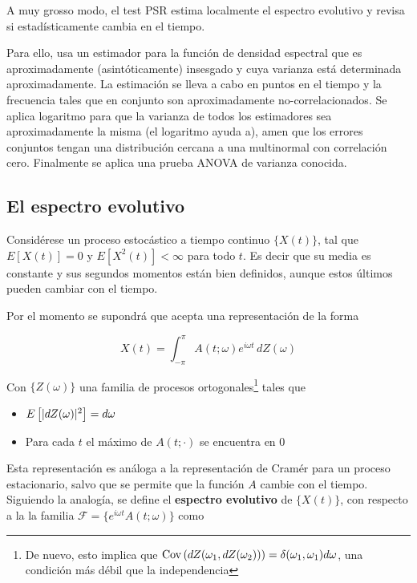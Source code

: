
A muy grosso modo, el test PSR estima localmente  el espectro evolutivo
 y revisa si estad\'isticamente
cambia en el tiempo.

Para ello, usa un estimador para la funci\'on de densidad espectral
que es aproximadamente (asint\'oticamente) insesgado y cuya varianza est\'a
determinada aproximadamente. La estimaci\'on se lleva a cabo en puntos en el tiempo y
la frecuencia tales que en conjunto son aproximadamente no-correlacionados.
Se aplica logaritmo para que la varianza de todos los estimadores sea aproximadamente
la misma (el logaritmo ayuda a), amen que los errores conjuntos tengan una
distribuci\'on cercana a una multinormal con correlaci\'on cero.
Finalmente se aplica una prueba ANOVA de varianza conocida.


\subsection{El espectro evolutivo}

Consid\'erese un proceso estoc\'astico a tiempo continuo $\{X(t)\}$, tal que
$E[X(t)]=0$ y $E\left[ X^{2}(t)\right] < \infty$ para todo $t$. Es decir que su media es constante
y sus segundos momentos est\'an bien definidos, aunque 
estos \'ultimos pueden cambiar con el tiempo.

Por el momento se supondr\'a que acepta una representaci\'on de la forma

\begin{equation*}
X(t) = \int_{-\pi}^{\pi} A(t ; \omega) e^{i\omega t} \, d Z(\omega)
\end{equation*}

Con $\{ Z(\omega) \}$ una familia de procesos ortogonales\footnote{De nuevo, esto implica que
$\mathrm{Cov}\left( dZ(\omega_1,dZ(\omega_2)) \right) = \delta(\omega_1,\omega_1) d\omega$, una condici\'on m\'as
d\'ebil que la independencia} tales que

\begin{itemize}
\item $E \left[\lvert  dZ(\omega) \rvert^{2} \right] = d\omega$
\item Para cada $t$ el m\'aximo de $A(t;\cdot)$ se encuentra en 0
\end{itemize}

Esta representaci\'on es an\'aloga a la representaci\'on de Cram\'er para un proceso
estacionario, salvo que se permite que la funci\'on $A$ cambie con el tiempo.
Siguiendo la analog\'ia, se define 
el \textbf{espectro evolutivo} de $\{X(t)\}$, con respecto a la la familia
$\mathcal{F} = \{ e^{i\omega t} A(t; \omega) \}$
 como
 
